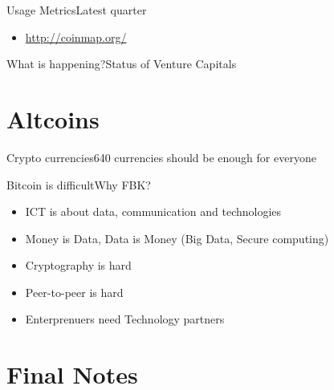 \documentclass[english,compress]{beamer}
\begin{document}
\begin{frame}{Usage Metrics}{Latest quarter}
\begin{itemize}
 \item \url{http://coinmap.org/} 
\end{itemize}
\end{frame}

\begin{frame}{What is happening?}{Status of Venture Capitals}
\end{frame}



\section{Altcoins}

\begin{frame}{Crypto currencies}{640 currencies should be enough for everyone}
\end{frame}


\begin{frame}{Bitcoin is difficult}{Why FBK?}

 \begin{itemize}
  \item ICT is about data, communication and technologies
  \item Money is Data, Data is Money (Big Data, Secure computing)
  \item Cryptography is hard
  \item Peer-to-peer is hard
  \item Enterprenuers need Technology partners
 \end{itemize}
 


\end{frame}






\section{Final Notes}
\end{document}
